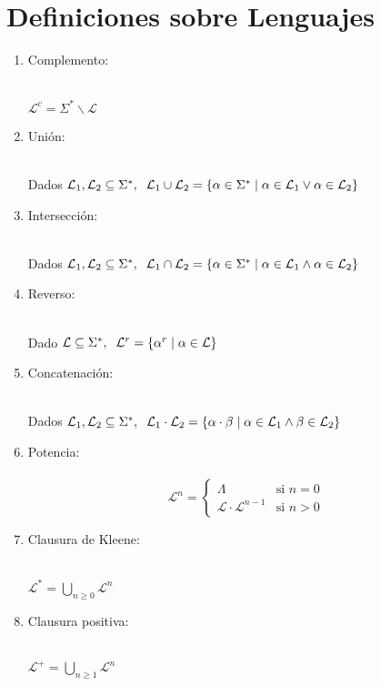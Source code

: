 \documentclass[12pt]{article}
\begin{document}
\section{Definiciones sobre Lenguajes}
\renewcommand\labelenumi{(\theenumi)}
\begin{enumerate}
    \item {Complemento:}
    \\
    \\
    \centerline{$\mathcal{L}^c=\Sigma^*\backslash\mathcal{L}$}
    \item {Unión:}
    \\
    \\
    \centerline{Dados $\mathcal{L}_1,\mathcal{L}_2 \subseteq \Sigma^*, \hspace{0.2cm} \mathcal{L}_1\cup\mathcal{L}_2 = \{\alpha \in \Sigma^* \mid \alpha \in \mathcal{L}_1\lor \alpha \in \mathcal{L}_2\}$}
    \item {Intersección:}
    \\
    \\
    \centerline{Dados $\mathcal{L}_1,\mathcal{L}_2 \subseteq \Sigma^*, \hspace{0.2cm} \mathcal{L}_1\cap\mathcal{L}_2 = \{\alpha \in \Sigma^* \mid \alpha \in \mathcal{L}_1\land \alpha \in \mathcal{L}_2\}$}
    \item {Reverso:}
    \\
    \\
    \centerline{Dado $\mathcal{L} \subseteq \Sigma^*,\hspace{0.2cm} \mathcal{L}^r= \{\alpha^r \mid \alpha \in \mathcal{L}\}$}
    \item {Concatenación:}
    \\
    \\
    \centerline{Dados $\mathcal{L}_1,\mathcal{L}_2 \subseteq \Sigma^*,\hspace{0.2cm} \mathcal{L}_1\cdot\mathcal{L}_2= \{\alpha \cdot \beta \mid \alpha \in \mathcal{L}_1 \land \beta \in \mathcal{L}_2\}$}
    \item {Potencia:}
    \\
    \\
    \[
    \mathcal{L}^n =
    \begin{cases} 
    \Lambda & \text{si } n = 0 \\
    \mathcal{L}\cdot\mathcal{L}^{n-1} & \text{si } n > 0
    \end{cases}
    \]
    \item {Clausura de Kleene:}
    \\
    \\
    \centerline{$\mathcal{L}^*=  \bigcup_{n \geq 0} \mathcal{L}^{n}$}
    \item {Clausura positiva:}
    \\
    \\
    \centerline{$\mathcal{L}^+=  \bigcup_{n \geq 1} \mathcal{L}^{n}$}
\end{enumerate}
\end{document}
